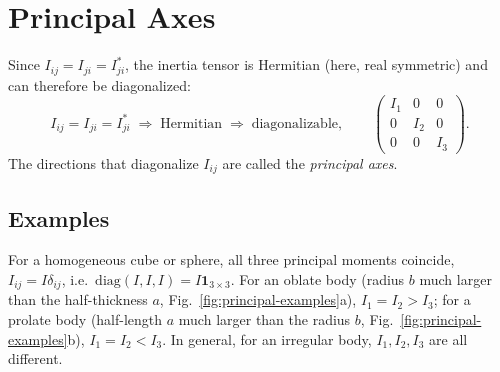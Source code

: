 \documentclass[11pt]{article}
\begin{document}
\section{Principal Axes}

Since $I_{ij}=I_{ji}=I_{ji}^*$, the inertia tensor is Hermitian (here, real symmetric) and can therefore be diagonalized:
\begin{equation}
I_{ij} = I_{ji} = I_{ji}^* \;\Rightarrow\; \text{Hermitian} \;\Rightarrow\; \text{diagonalizable}, \qquad
\begin{pmatrix} I_1 & 0 & 0\\ 0 & I_2 & 0\\ 0 & 0 & I_3\end{pmatrix}.
\label{eq:hermitian}
\end{equation}
The directions that diagonalize $I_{ij}$ are called the \emph{principal axes}.

\subsection{Examples}

For a homogeneous cube or sphere, all three principal moments coincide, $I_{ij}=I\delta_{ij}$, i.e.\ $\mathrm{diag}(I,I,I)=I\mathbf{1}_{3\times3}$. For an oblate body (radius $b$ much larger than the half-thickness $a$, Fig.~\ref{fig:principal-examples}a), $I_1=I_2>I_3$; for a prolate body (half-length $a$ much larger than the radius $b$, Fig.~\ref{fig:principal-examples}b), $I_1=I_2<I_3$. In general, for an irregular body, $I_1,I_2,I_3$ are all different.
\end{document}
